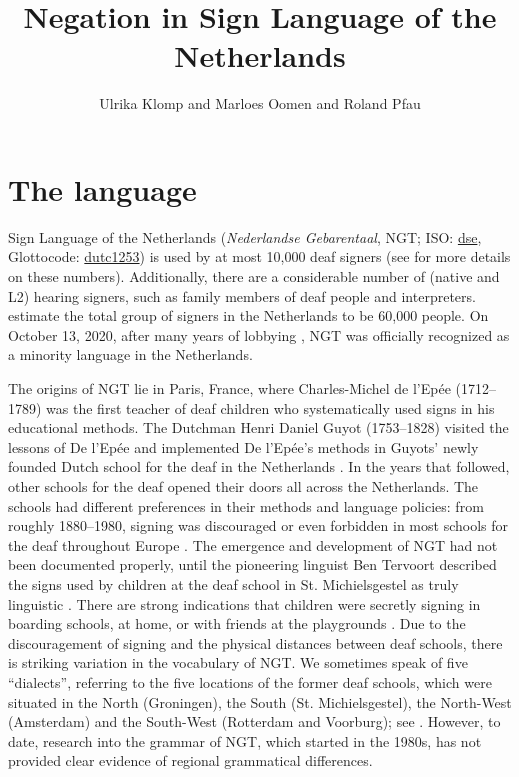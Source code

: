 \documentclass[output=paper,colorlinks,citecolor=brown]{langscibook}
\author{Ulrika Klomp\affiliation{HU University of Applied Sciences Utrecht} and Marloes Oomen\affiliation{University of Amsterdam} and  Roland Pfau\affiliation{University of Amsterdam}}
\title{Negation in Sign Language of the Netherlands}
\begin{document}
\maketitle

\section{The language} 
Sign Language of the Netherlands (\textit{Nederlandse Gebarentaal}, NGT; ISO: \href{https://iso639-3.sil.org/code/dse}{dse}, Glottocode: \href{https://glottolog.org/resource/languoid/id/dutc1253}{dutc1253}) is used by at most 10,000 deaf signers (see \citealt{Klomp2021} for more details on these numbers). Additionally, there are a considerable number of (native and L2) hearing signers, such as family members of deaf people and interpreters. \citet{CokartEtAl2019} estimate the total group of signers in the Netherlands to be 60,000 people. On October 13, 2020, after many years of lobbying \citep{CokartEtAl2019}, NGT was officially recognized as a minority language in the Netherlands. 
 
The origins of NGT lie in Paris, France, where Charles-Michel de l’Epée (1712--1789) was the first teacher of deaf children who systematically used signs in his educational methods. The Dutchman Henri Daniel Guyot (1753--1828) visited the lessons of De l’Epée and implemented De l’Epée’s methods in Guyots’ newly founded Dutch school for the deaf in the Netherlands \citep{Tijsseling2014}. In the years that followed, other schools for the deaf opened their doors all across the Netherlands. The schools had different preferences in their methods and language policies: from roughly 1880--1980, signing was discouraged or even forbidden in most schools for the deaf throughout Europe \citep{BogaerdeEtAl2016}. The emergence and development of NGT had not been documented properly, until the pioneering linguist Ben Tervoort described the signs used by children at the deaf school in St. Michielsgestel as truly linguistic \citep{Tervoort1953}. There are strong indications that children were secretly signing in boarding schools, at home, or with friends at the playgrounds \citep{Tijsseling2014}. Due to the discouragement of signing and the physical distances between deaf schools, there is striking variation in the vocabulary of NGT. We sometimes speak of five “dialects”, referring to the five locations of the former deaf schools, which were situated in the North (Groningen), the South (St. Michielsgestel), the North-West (Amsterdam) and the South-West (Rotterdam and Voorburg); see . However, to date, research into the grammar of NGT, which started in the 1980s, has not provided clear evidence of regional grammatical differences.
\end{document}
